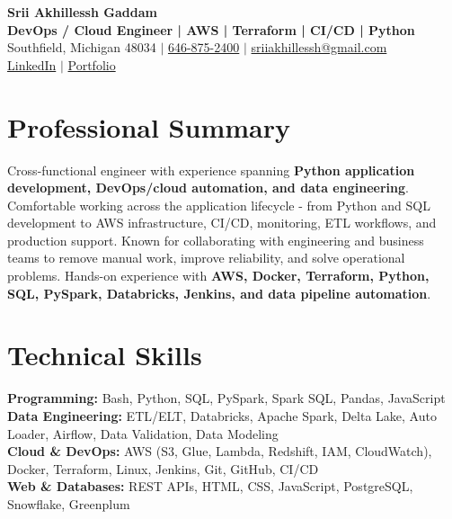 \documentclass[letterpaper,10pt]{article}
\begin{document}
\fontsize{9.35pt}{10.45pt}\selectfont

\begin{center}
    {\LARGE \textbf{Srii Akhillessh Gaddam}} \\[-1pt]
    \textbf{DevOps / Cloud Engineer | AWS | Terraform | CI/CD | Python} \\[2pt]
    Southfield, Michigan 48034 $|$
    \href{tel:6468752400}{646-875-2400} $|$
    \href{mailto:sriiakhillessh@gmail.com}{sriiakhillessh@gmail.com} \\[1pt]
    \href{https://www.linkedin.com/in/srii-akhiilessh-gaddam-b48668191/}{LinkedIn} $|$
    \href{https://sriiakhillesshg.github.io/portfolio/}{Portfolio}
\end{center}
\vspace{-8pt}

\section{Professional Summary}
\small{Cross-functional engineer with experience spanning \textbf{Python application development, DevOps/cloud automation, and data engineering}. Comfortable working across the application lifecycle - from Python and SQL development to AWS infrastructure, CI/CD, monitoring, ETL workflows, and production support. Known for collaborating with engineering and business teams to remove manual work, improve reliability, and solve operational problems. Hands-on experience with \textbf{AWS, Docker, Terraform, Python, SQL, PySpark, Databricks, Jenkins, and data pipeline automation}.}

\section{Technical Skills}
\small{
\textbf{Programming:} Bash, Python, SQL, PySpark, Spark SQL, Pandas, JavaScript \\
\textbf{Data Engineering:} ETL/ELT, Databricks, Apache Spark, Delta Lake, Auto Loader, Airflow, Data Validation, Data Modeling \\
\textbf{Cloud \& DevOps:} AWS (S3, Glue, Lambda, Redshift, IAM, CloudWatch), Docker, Terraform, Linux, Jenkins, Git, GitHub, CI/CD \\
\textbf{Web \& Databases:} REST APIs, HTML, CSS, JavaScript, PostgreSQL, Snowflake, Greenplum
}
\end{document}
